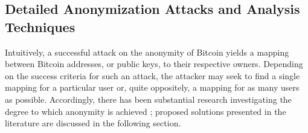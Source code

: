 

\subsection{Detailed Anonymization Attacks and Analysis Techniques} \label{sec:attacks}

Intuitively, a successful attack on the anonymity of Bitcoin yields a mapping between Bitcoin addresses, or public keys, to their respective owners. Depending on the success criteria for such an attack, the attacker may seek to find a single mapping for a particular user or, quite oppositely, a mapping for as many users as possible. Accordingly, there has been substantial research investigating the degree to which anonymity is achieved \cite{ReidHarrigan13,BetterToBitter,Fistful12,Shamir13-bitcoingraph,Androulaki12-privacy}; proposed solutions presented in the literature are discussed in the following section.


